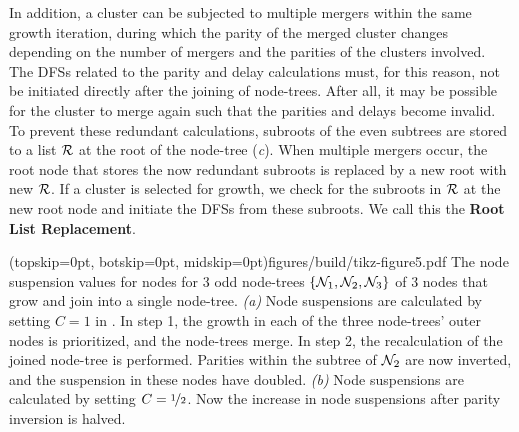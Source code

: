 In addition, a cluster can be subjected to multiple mergers within the same growth iteration, during which the parity of the merged cluster changes depending on the number of mergers and the parities of the clusters involved. The DFSs related to the parity and delay calculations must, for this reason, not be initiated directly after the joining of node-trees. After all, it may be possible for the cluster to merge again such that the parities and delays become invalid. To prevent these redundant calculations, subroots of the even subtrees are stored to a list $\mathcal{R}$ at the root of the node-tree (\emph{c}). When multiple mergers occur, the root node that stores the now redundant subroots is replaced by a new root with new $\mathcal{R}$. If a cluster is selected for growth, we check for the subroots in $\mathcal{R}$ at the new root node and initiate the DFSs from these subroots. We call this the \textbf{Root List Replacement}. 

\Figure[htb](topskip=0pt, botskip=0pt, midskip=0pt){figures/build/tikz-figure5.pdf}{
    The node suspension values for nodes for 3 odd node-trees $\{\mathcal{N}_1, \mathcal{N}_2, \mathcal{N}_3\}$ of 3 nodes that grow and join into a single node-tree. \emph{(a)} Node suspensions are calculated by setting $C=1$ in . In step 1, the growth in each of the three node-trees' outer nodes is prioritized, and the node-trees merge. In step 2, the recalculation of the joined node-tree is performed. Parities within the subtree of $\mathcal{N}_2$ are now inverted, and the suspension in these nodes have doubled. \emph{(b)} Node suspensions are calculated by setting $C=\nicefrac{1}{2}$. Now the increase in node suspensions after parity inversion is halved.\label{fig5}}

